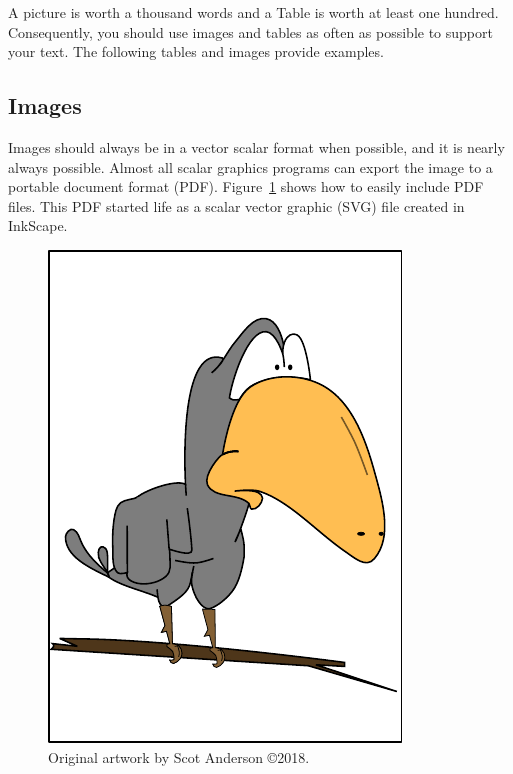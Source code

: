 \documentclass[pdf,bookmarks,colorlinks=true]{IEEEtran}
\begin{document}
A picture is worth a thousand words and a Table is worth at least one hundred. Consequently, you should use images and tables as often as possible to support your text. The following tables and images provide examples.

\subsection{Images}

Images should always be in a vector scalar format when possible, and it is nearly always possible. Almost all scalar graphics programs can export the image to a portable document format (PDF). Figure~\ref{fig:crow} shows how to easily include PDF files. This PDF started life as a scalar vector graphic (SVG) file created in InkScape. 

\begin{figure}[h]
    \centering
    \includegraphics[trim={0.1cm 1cm 0.1cm 1cm},clip,width=\columnwidth]{figures/Crow.pdf}
    \caption{Original artwork by Scot Anderson \copyright 2018.}
    \label{fig:crow}
\end{figure}
\end{document}
